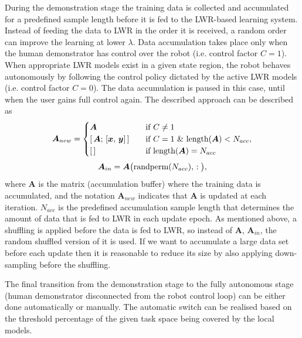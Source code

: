 During the demonstration stage the training data is collected and accumulated for a predefined sample length before it is fed to the LWR-based learning system. Instead of feeding the data to LWR in the order it is received, a random order can improve the learning at lower $\lambda$. Data accumulation takes place only when the human demonstrator has control over the robot (i.e. control factor $C = 1$). When appropriate LWR models exist in a given state region, the robot behaves autonomously by following the control policy dictated by the active LWR models (i.e. control factor $C = 0$). The data accumulation is paused in this case, until when the user gains full control again. The described approach can be described as
\begin{equation}
\bm{A}_{new} = \begin{cases} \bm{A} & \quad \text{if } C \neq 1
\\ [\thinspace \bm{A}; \thinspace [\bm{x}, \thinspace \bm{y}]\thinspace ] & \quad \text{if } C = 1 \text{ \& } \text{length}(\bm{A}) < N_{acc},
\\ [\thinspace] & \quad \text{if } \text{length}(\bm{A}) = N_{acc} \\ \end{cases}
\label{eq:accumulate}
\end{equation}
\begin{equation}
\bm{A}_{in} = \bm{A}\big(\text{randperm}(N_{acc}),\thinspace :\big),
\label{eq:shuffle}
\end{equation}
where $\bm{A}$ is the matrix (accumulation buffer) where the training data is accumulated, and the notation $\bm{A}_{new}$ indicates that $\bm{A}$ is updated at each iteration. $N_{acc}$ is the predefined accumulation sample length that determines the amount of data that is fed to LWR in each update epoch. As mentioned above, a shuffling is applied before the data is fed to LWR, so instead of $\bm{A}$, $\bm{A}_{in}$, the random shuffled version of it is used. If we want to accumulate a large data set before each update then it is reasonable to reduce its size by also applying down-sampling before the shuffling.

The final transition from the demonstration stage to the fully autonomous stage (human demonstrator disconnected from the robot control loop) can be either done automatically or manually. The automatic switch can be realised based on the threshold percentage of the given task space being covered by the local models.


